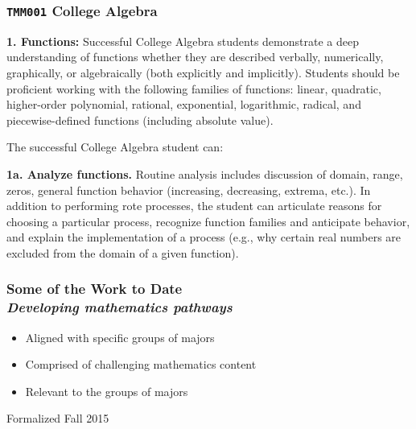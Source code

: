 \documentclass[14pt]{beamer}
\newcounter{a}
\newcounter{b}
\begin{document}
\begin{frame}
  \frametitle{\texttt{TMM001} College Algebra}

\footnotesize

\textbf{1. Functions: }
Successful College Algebra students demonstrate a deep understanding of 
functions whether they are described verbally, numerically, graphically, or algebraically (both 
explicitly and implicitly). Students should be proficient working with the following families of functions:  linear, quadratic, higher-order polynomial, rational, exponential, logarithmic, radical, and piecewise-defined functions (including absolute value).

\vfill

The successful College Algebra student can:

\null\hfill\parbox{0.95\textwidth}{\textbf{1a. Analyze functions.}  Routine analysis includes discussion of domain, range, zeros, general function behavior (increasing, decreasing, extrema, etc.). In addition to performing rote processes, the student can articulate reasons for choosing a particular process, recognize function families and anticipate behavior, 
and explain the implementation of a process (e.g., why certain real numbers are excluded from the domain of a given function).}

\end{frame}


\begin{frame}
  \frametitle{Some of the Work to Date \\
\textit{Developing mathematics pathways}}

\begin{itemize}
\item Aligned with specific groups of majors
\item Comprised of challenging mathematics content
\item Relevant to the groups of majors
\end{itemize}

\vfill\hfill\textcolor{dark}{\footnotesize Formalized Fall 2015}
\end{frame}
\end{document}
